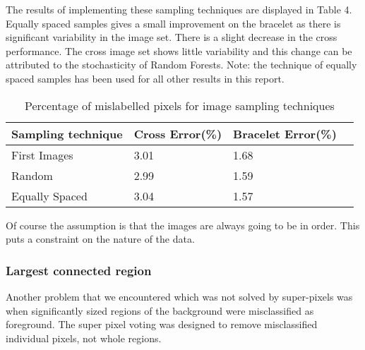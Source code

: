 \documentclass[12pt]{IIBproject}
\begin{document}
The results of implementing these sampling techniques are displayed in Table 4. Equally spaced samples gives a small improvement on the bracelet as there is significant variability in the image set. There is a slight decrease in the cross performance. The cross image set shows little variability and this change can be attributed to the stochasticity of Random Forests. Note: the technique of equally spaced samples has been used for all other results in this report.
\begin{table}
\begin{center}
    \begin{tabular}{ | l | l | l | p{5cm} |}
    \hline
    Sampling technique & Cross Error(\%) & Bracelet Error(\%) \\ \hline
    First Images & 3.01 & 1.68 \\ \hline
    Random & 2.99 & 1.59 \\
    \hline
    Equally Spaced & 3.04 & 1.57 \\
    \hline
    \end{tabular}
    \caption{Percentage of mislabelled pixels for image sampling techniques}\label{table:somename}
\end{center}
\end{table}
 Of course the assumption is that the images are always going to be in order. This puts a constraint on the nature of the data.

\subsubsection{Largest connected region}
Another problem that we encountered which was not solved by super-pixels was when significantly sized regions of the background were misclassified as foreground. The super pixel voting was designed to remove misclassified individual pixels, not whole regions. 
\end{document}
